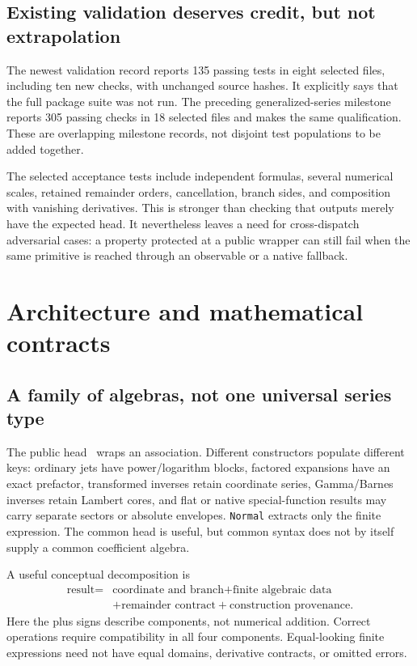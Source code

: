\subsection{Existing validation deserves credit, but not extrapolation}

The newest validation record reports 135 passing tests in eight selected files, including ten new checks, with unchanged source hashes. It explicitly says that the full package suite was not run. The preceding generalized-series milestone reports 305 passing checks in 18 selected files and makes the same qualification. These are overlapping milestone records, not disjoint test populations to be added together.\cite{validation}

The selected acceptance tests include independent formulas, several numerical scales, retained remainder orders, cancellation, branch sides, and composition with vanishing derivatives. This is stronger than checking that outputs merely have the expected head. It nevertheless leaves a need for cross-dispatch adversarial cases: a property protected at a public wrapper can still fail when the same primitive is reached through an observable or a native fallback.\cite{acceptance,operations}

\section{Architecture and mathematical contracts}

\subsection{A family of algebras, not one universal series type}

The public head \gseries\ wraps an association. Different constructors populate different keys: ordinary jets have power/logarithm blocks, factored expansions have an exact prefactor, transformed inverses retain coordinate series, Gamma/Barnes inverses retain Lambert cores, and flat or native special-function results may carry separate sectors or absolute envelopes. \texttt{Normal} extracts only the finite expression. The common head is useful, but common syntax does not by itself supply a common coefficient algebra.\cite{core,operations,guide,gammainverse,native,flat}

A useful conceptual decomposition is
\begin{align*}
  \text{result}={}&\text{coordinate and branch}
  +\text{finite algebraic data}\\
  &+\text{remainder contract}
  +\text{construction provenance}.
\end{align*}
Here the plus signs describe components, not numerical addition. Correct operations require compatibility in all four components. Equal-looking finite expressions need not have equal domains, derivative contracts, or omitted errors.

